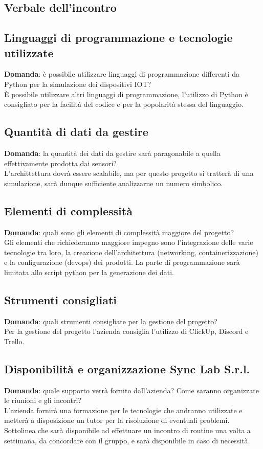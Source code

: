 \documentclass[italian,12pt]{article} %
\begin{document}
\begin{flushleft}
\section{Verbale dell'incontro}
\subsection{Linguaggi di programmazione e tecnologie utilizzate}
	\textbf{Domanda}: è possibile utilizzare linguaggi di programmazione differenti da Python per la simulazione dei dispositivi IOT?\\
	È possibile utilizzare altri linguaggi di programmazione, l'utilizzo di Python è consigliato per la facilità del codice e per la popolarità stessa del linguaggio.


\subsection{Quantità di dati da gestire}
	\textbf{Domanda}: la quantità dei dati da gestire sarà paragonabile a quella effettivamente prodotta dai sensori?\\
	L'archittettura dovrà essere scalabile, ma per questo progetto si tratterà di una simulazione, sarà dunque sufficiente analizzarne un numero simbolico.

\subsection{Elementi di complessità}
	\textbf{Domanda}: quali sono gli elementi di complessità maggiore del progetto?\\
	Gli elementi che richiederanno maggiore impegno sono l'integrazione delle varie tecnologie tra loro, la creazione dell'architettura (networking, containerizzazione) e la configurazione (devops) dei prodotti. La parte di programmazione sarà limitata allo script python per la generazione dei dati.

\subsection{Strumenti consigliati}
	\textbf{Domanda}: quali strumenti consigliate per la gestione del progetto?\\
	Per la gestione del progetto l'azienda consiglia l'utilizzo di ClickUp, Discord e Trello.

\subsection{Disponibilità e organizzazione Sync Lab S.r.l.}
	\textbf{Domanda}: quale supporto verrà fornito dall'azienda? Come saranno organizzate le riunioni e gli incontri?\\
	L'azienda fornirà una formazione per le tecnologie che andranno utilizzate e metterà a disposizione un tutor per la risoluzione di eventuali problemi. Sottolinea che sarà disponibile ad effettuare un incontro di routine una volta a settimana, da concordare con il gruppo, e sarà disponibile in caso di necessità. 

\end{flushleft}
\end{document}
